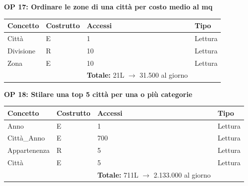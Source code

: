 \documentclass[a4paper,12pt]{report}
\begin{document}
            \newpage
            \noindent
            \textbf{OP 17: Ordinare le zone di una città per costo medio al mq}
        	\begin{table}[H]
            \centering
             \begin{tabular}{llll}
             \rowcolor{yellow!20} \textbf{Concetto} & \textbf{Costrutto} & \textbf{Accessi} & \textbf{Tipo}\\ [0.5ex] 
             \hline
             Città & E & 1 & Lettura \\ 
             Divisione & R & 10 & Lettura \\ 
             Zona & E & 10 & Lettura \\ 
             \hline
                \rowcolor{yellow!20} &   & \textbf{Totale:} 21L $\rightarrow$ 31.500 al giorno &  \\ [1ex] 
             
             \end{tabular}
            \end{table}

            \noindent
            \textbf{OP 18: Stilare una top 5 città per una o più categorie}
        	\begin{table}[H]
            \centering
             \begin{tabular}{llll}
             \rowcolor{yellow!20} \textbf{Concetto} & \textbf{Costrutto} & \textbf{Accessi} & \textbf{Tipo}\\ [0.5ex] 
             \hline
             Anno & E & 1 & Lettura \\ 
             Città\_Anno & E & 700 & Lettura \\ 
             Appartenenza & R & 5 & Lettura \\ 
             Città & E & 5 & Lettura \\ 
             \hline
                \rowcolor{yellow!20} &   & \textbf{Totale:} 711L $\rightarrow$ 2.133.000 al giorno &  \\ [1ex] 
             
             \end{tabular}
            \end{table}
\end{document}
